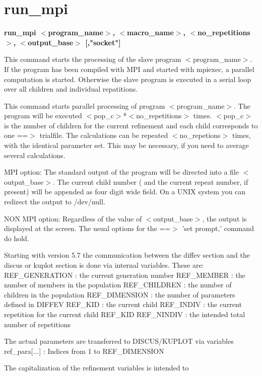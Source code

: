\section{run\_mpi}
{\bf run\_mpi $ <$program\_name$> $, $ <$macro\_name$> $, $ <$no\_repetitions$> $, $ <$output\_base$> $ [,"socket"] \par }
\par
\vspace{3pt}
This command starts the processing of the slave program $ <$program\_name$> $. 
If the program has been compiled with MPI and started with mpiexec, 
a parallel computation is started. Otherwise the slave program is 
executed in a serial loop over all children and individual repatitions. 
\par
This command starts parallel processing of program $ <$program\_name$> $. 
The program will be executed $ <$pop\_c$> $*$ <$no\_repetitions$> $ times. 
$ <$pop\_c$> $ is the number of children for the current refinement and 
each child corresponds to one ==$> $ trialfile. 
The calculations can be repeated $ <$no\_repetions$> $ times, with the identical 
parameter set. This may be necessary, if you need to average several 
calculations. 
\par
MPI option: 
The standard output of the program will be directed into a file 
$ <$output\_base$> $. The current child number ( and the current repeat 
number, if present) will be appended as four digit wide field. 
On a UNIX system you can redirect the output to /dev/null. 
\par
NON MPI option: 
Regardless of the value of $ <$output\_base$> $, the output is displayed 
at the screen. The usual options for the ==$> $ 'set prompt,' command 
do hold. 
\par
Starting with version 5.7 the communication between the diffev section 
and the discus or kuplot section is done via internal variables. 
These are: 
REF\_GENERATION  : the current generation number 
REF\_MEMBER      : the number of members in the population 
REF\_CHILDREN    : the number of children in the population 
REF\_DIMENSION   : the number of parameters defined in DIFFEV 
REF\_KID         : the current child 
REF\_INDIV       : the current repetition for the current child REF\_KID 
REF\_NINDIV      : the intended total number of repetitions 
\par
The actual parameters are transferred to DISCUS/KUPLOT via variables 
ref\_para[...]   : Indices from 1 to REF\_DIMENSION 
\par
The capitalization of the refinement variables is intended to 
